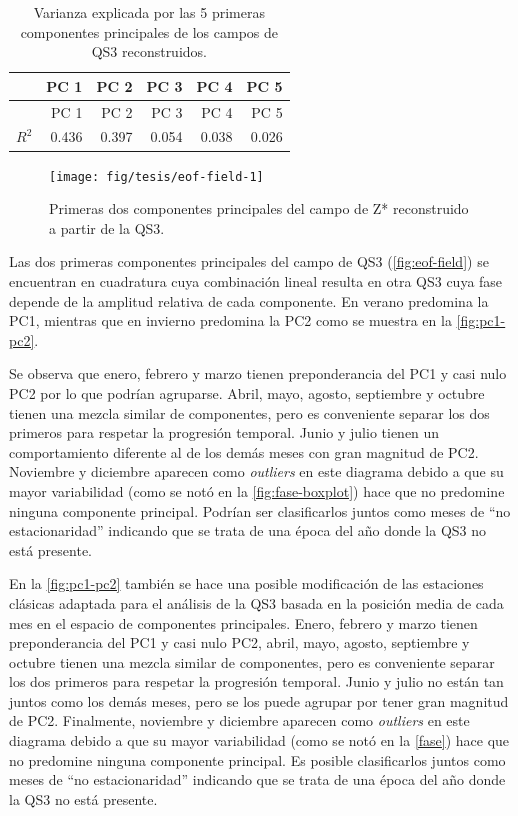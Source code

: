 \documentclass[spanish,a4paper,12pt,oneside]{book}
\begin{document}
\begin{longtable}[]{@{}lrrrrr@{}}
\caption{Varianza explicada por las 5 primeras componentes principales
de los campos de QS3 reconstruidos.\label{eoftabla}}\tabularnewline
\toprule
& PC 1 & PC 2 & PC 3 & PC 4 & PC 5\tabularnewline
\midrule
\endfirsthead
\toprule
& PC 1 & PC 2 & PC 3 & PC 4 & PC 5\tabularnewline
\midrule
\endhead
\(R^2\) & 0.436 & 0.397 & 0.054 & 0.038 & 0.026\tabularnewline
\bottomrule
\end{longtable}

\begin{figure}
\texttt{[image: fig/tesis/eof-field-1]} \caption{Primeras dos componentes principales del campo de Z* reconstruido a partir de la QS3.}\label{fig:eof-field}
\end{figure}

Las dos primeras componentes principales del campo de QS3
(\autoref{fig:eof-field}) se encuentran en cuadratura cuya combinación
lineal resulta en otra QS3 cuya fase depende de la amplitud relativa de
cada componente. En verano predomina la PC1, mientras que en invierno
predomina la PC2 como se muestra en la \autoref{fig:pc1-pc2}.

Se observa que enero, febrero y marzo tienen preponderancia del PC1 y
casi nulo PC2 por lo que podrían agruparse. Abril, mayo, agosto,
septiembre y octubre tienen una mezcla similar de componentes, pero es
conveniente separar los dos primeros para respetar la progresión
temporal. Junio y julio tienen un comportamiento diferente al de los
demás meses con gran magnitud de PC2. Noviembre y diciembre aparecen
como \emph{outliers} en este diagrama debido a que su mayor variabilidad
(como se notó en la \autoref{fig:fase-boxplot}) hace que no predomine
ninguna componente principal. Podrían ser clasificarlos juntos como
meses de ``no estacionaridad'' indicando que se trata de una época del
año donde la QS3 no está presente.

En la \autoref{fig:pc1-pc2} también se hace una posible modificación de
las estaciones clásicas adaptada para el análisis de la QS3 basada en la
posición media de cada mes en el espacio de componentes principales.
Enero, febrero y marzo tienen preponderancia del PC1 y casi nulo PC2,
abril, mayo, agosto, septiembre y octubre tienen una mezcla similar de
componentes, pero es conveniente separar los dos primeros para respetar
la progresión temporal. Junio y julio no están tan juntos como los demás
meses, pero se los puede agrupar por tener gran magnitud de PC2.
Finalmente, noviembre y diciembre aparecen como \emph{outliers} en este
diagrama debido a que su mayor variabilidad (como se notó en la
\autoref{fase}) hace que no predomine ninguna componente principal. Es
posible clasificarlos juntos como meses de ``no estacionaridad''
indicando que se trata de una época del año donde la QS3 no está
presente.
\end{document}

